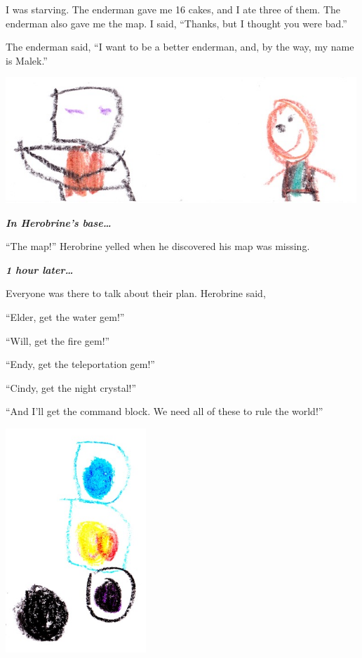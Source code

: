 \documentclass[booklet, twoside, 12pt]{krantz}
\begin{document}
I was starving. The enderman gave me 16 cakes, and I ate three of them.
The enderman also gave me the map. I said, ``Thanks, but I thought you
were bad.''

The enderman said, ``I want to be a better enderman, and, by the way, my
name is Malek.''

\includegraphics[width=5.20833in,height=\textheight]{img/final-war/malek-beckett.jpg}

\textbf{\emph{In Herobrine's base\ldots{}}}

``The map!'' Herobrine yelled when he discovered his map was missing.

\textbf{\emph{1 hour later\ldots{}}}

Everyone was there to talk about their plan. Herobrine said,

``Elder, get the water gem!''

``Will, get the fire gem!''

``Endy, get the teleportation gem!''

``Cindy, get the night crystal!''

``And I'll get the command block. We need all of these to rule the
world!''

\includegraphics[width=2.08333in,height=\textheight]{img/final-war/crystals.jpg}
\end{document}
